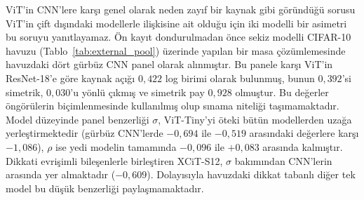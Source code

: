 ViT'in CNN'lere karşı genel olarak neden zayıf bir kaynak gibi göründüğü sorusu ViT'in çift dışındaki modellerle ilişkisine ait olduğu için iki modelli bir asimetri bu soruyu yanıtlayamaz. Ön kayıt dondurulmadan önce sekiz modelli CIFAR-10 havuzu (Tablo~\ref{tab:external_pool}) üzerinde yapılan bir masa çözümlemesinde havuzdaki dört gürbüz CNN panel olarak alınmıştır. Bu panele karşı ViT'in ResNet-18'e göre kaynak açığı $0{,}422$ log birimi olarak bulunmuş, bunun $0{,}392$'si simetrik, $0{,}030$'u yönlü çıkmış ve simetrik pay $0{,}928$ olmuştur. Bu değerler öngörülerin biçimlenmesinde kullanılmış olup sınama niteliği taşımamaktadır. Model düzeyinde panel benzerliği $\sigma$, ViT-Tiny'yi öteki bütün modellerden uzağa yerleştirmektedir (gürbüz CNN'lerde $-0{,}694$ ile $-0{,}519$ arasındaki değerlere karşı $-1{,}086$), $\rho$ ise yedi modelin tamamında $-0{,}096$ ile $+0{,}083$ arasında kalmıştır. Dikkati evrişimli bileşenlerle birleştiren XCiT-S12, $\sigma$ bakımından CNN'lerin arasında yer almaktadır ($-0{,}609$). Dolayısıyla havuzdaki dikkat tabanlı diğer tek model bu düşük benzerliği paylaşmamaktadır.

